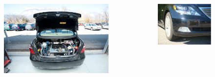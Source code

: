 \documentclass{beamer}
\begin{document}
\begin{frame}
		  \begin{columns}[t]
		  \begin{column}{5cm}
		  \begin{figure}[h]
			\center
			\includegraphics[scale=0.7]{../img/testbed:trunc}
		  \end{figure}
		  \end{column}
		  
		  \begin{column}{5cm}
		  \begin{figure}[h]
			\center
			\includegraphics[scale=0.26]{../img/testbed:ibeo}
		  \end{figure}   
		  \end{column}
		 \end{columns}		 
	\end{frame}
\end{document}
